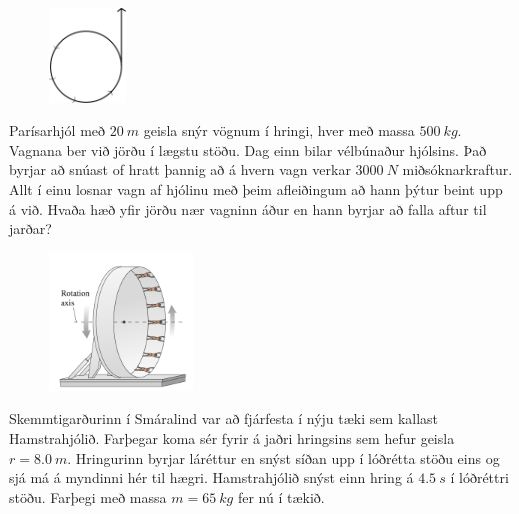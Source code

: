 \begin{enumerate}[label = \textbf{Dæmi \thechapter.\arabic*.}]
\vspace{0.25cm}

\begin{minipage}{\linewidth}
\begin{figure}
\hspace{1.5cm}
\includegraphics[width=0.8in]{images/parisarhjol.png}
\end{figure}

\item Parísarhjól með $\SI{20}{m}$ geisla snýr vögnum í hringi, hver með massa $\SI{500}{kg}$. Vagnana ber við jörðu í lægstu stöðu. Dag einn bilar vélbúnaður hjólsins. Það byrjar að snúast of hratt þannig að á hvern vagn verkar $\SI{3000}{N}$ miðsóknarkraftur. Allt í einu losnar vagn af hjólinu með þeim afleiðingum að hann þýtur beint upp á við. Hvaða hæð yfir jörðu nær vagninn áður en hann byrjar að falla aftur til jarðar?

\end{minipage}

\newpage

\begin{minipage}{\linewidth}
\begin{figure}
\vspace{-1cm}
\includegraphics[width=1.5in]{images/hringhreyfing2.png}
\end{figure}

\item Skemmtigarðurinn í Smáralind var að fjárfesta í nýju tæki sem kallast Hamstrahjólið. Farþegar koma sér fyrir á jaðri hringsins sem hefur geisla $r = \SI{8.0}{m}$. Hringurinn byrjar láréttur en snýst síðan upp í lóðrétta stöðu eins og sjá má á myndinni hér til hægri. Hamstrahjólið snýst einn hring á $\SI{4.5}{s}$ í lóðréttri stöðu. Farþegi með massa $m = \SI{65}{kg}$ fer nú í tækið.


\end{minipage}
\end{enumerate}
